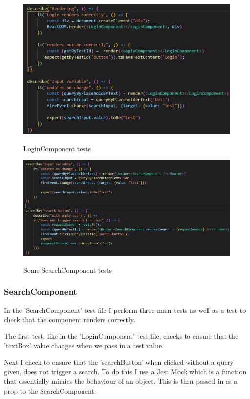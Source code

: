 \begin{figure}[ht]
    \centering
    \includegraphics[scale=0.5]{Images/5.png} 
    \label{test5_label}
    \caption{LoginComponent tests}
\end{figure}
\begin{figure}[ht]
    \centering
    \includegraphics[scale=0.4]{Images/test3.png} 
    \label{test3_label}
    \caption{Some SearchComponent tests}
\end{figure}

\newpage
\subsubsection{SearchComponent}
In the 'SearchComponent' test file I perform three main tests as well as a test to check that the component renders correctly.

The first test, like in the 'LoginComponent' test file, checks to ensure that the 'textBox' value changes when we pass in a test value.

Next I check to ensure that the 'searchButton' when clicked without a query given, does not trigger a search. To do this I use a Jest Mock which is a function that essentially mimics the behaviour of an object. This is then passed in as a prop to the SearchComponent.

